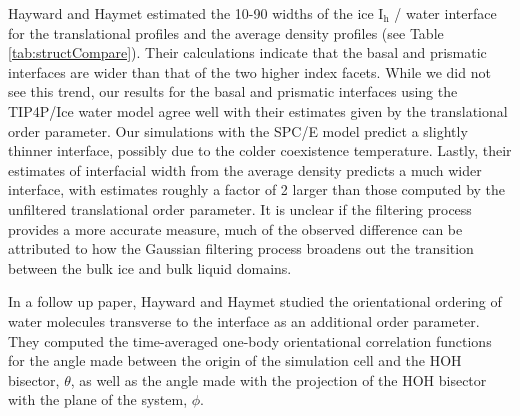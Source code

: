 Hayward and Haymet estimated the 10-90 widths of the ice
I$_\mathrm{h}$ / water interface for the translational profiles and
the average density profiles (see Table
\ref{tab:structCompare}). Their calculations indicate that the basal
and prismatic interfaces are wider than that of the two higher index
facets. While we did not see this trend, our results for the basal and
prismatic interfaces using the TIP4P/Ice water model agree well with
their estimates given by the translational order parameter. Our
simulations with the SPC/E model predict a slightly thinner interface,
possibly due to the colder coexistence temperature. Lastly, their
estimates of interfacial width from the average density predicts a
much wider interface, with estimates roughly a factor of 2 larger than
those computed by the unfiltered translational order parameter. It is
unclear if the filtering process provides a more accurate measure,
much of the observed difference can be attributed to how the Gaussian
filtering process broadens out the transition between the bulk ice and
bulk liquid domains.

In a follow up paper, Hayward and Haymet studied the orientational
ordering of water molecules transverse to the interface as an
additional order parameter.\cite{Hayward2002} They computed the
time-averaged one-body orientational correlation functions for the
angle made between the origin of the simulation cell and the HOH
bisector, $\theta$, as well as the angle made with the projection of
the HOH bisector with the plane of the system, $\phi$.





